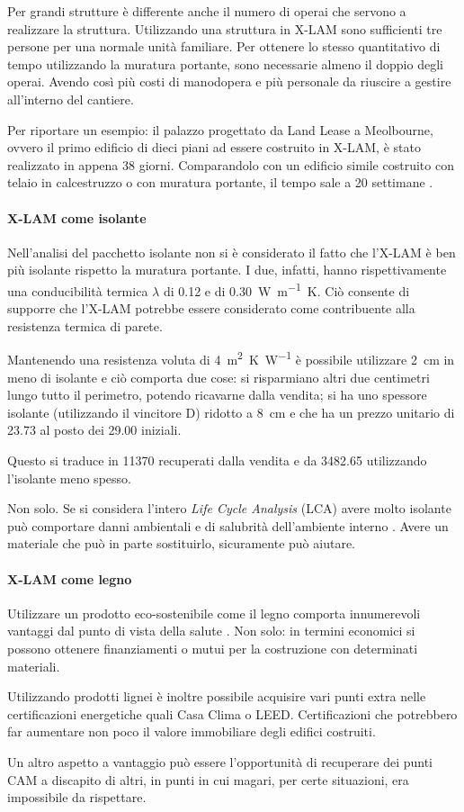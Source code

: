 Per grandi strutture è differente anche il numero di operai che servono a realizzare la struttura. Utilizzando una struttura in X-LAM sono sufficienti tre persone per una normale unità familiare. Per ottenere lo stesso quantitativo di tempo utilizzando la muratura portante, sono necessarie almeno il doppio degli operai. Avendo così più costi di manodopera e più personale da riuscire a gestire all'interno del cantiere. 

Per riportare un esempio: il palazzo progettato da Land Lease a Meolbourne, ovvero il primo edificio di dieci piani ad essere costruito in X-LAM, è stato realizzato in appena 38 giorni. Comparandolo con un edificio simile costruito con telaio in calcestruzzo o con muratura portante, il tempo sale a 20 settimane \cite[39]{10storey}. 


\paragraph{X-LAM come isolante}
Nell'analisi del pacchetto isolante non si è considerato il fatto che l'X-LAM è ben più isolante rispetto la muratura portante. I due, infatti, hanno rispettivamente una conducibilità termica $\lambda$ di \SI{0.12}{} e di \SI{0.30}{W\per\metre K}.
Ciò consente di supporre che l'X-LAM potrebbe essere considerato come contribuente alla resistenza termica di parete. 

Mantenendo una resistenza voluta di \SI{4}{\square\metre K\per W} è possibile utilizzare \SI{2}{\centi\metre} in meno di isolante e ciò comporta due cose: si risparmiano altri due centimetri lungo tutto il perimetro, potendo ricavarne dalla vendita; si ha uno spessore isolante (utilizzando il vincitore D) ridotto a \SI{8}{\centi\metre} e che ha un prezzo unitario di \SI{23.73}{\teuro} al posto dei \SI{29.00}{\teuro} iniziali.

Questo si traduce in \SI{11370}{\teuro} recuperati dalla vendita e da \SI{3482.65}{\teuro} utilizzando l'isolante meno spesso.

Non solo. Se si considera l'intero \textit{Life Cycle Analysis} (LCA) avere molto isolante può comportare danni ambientali e di salubrità dell'ambiente interno \cite{reijnders_comprehensiveness_1999}. Avere un materiale che può in parte sostituirlo, sicuramente può aiutare. 
\paragraph{X-LAM come legno}
Utilizzare un prodotto eco-sostenibile come il legno comporta innumerevoli vantaggi dal punto di vista della salute \cite{EnergyCost}. 
Non solo: in termini economici si possono ottenere finanziamenti o mutui per la costruzione con determinati materiali. 

Utilizzando prodotti lignei è inoltre possibile acquisire vari punti extra nelle certificazioni energetiche quali Casa Clima o LEED. 
Certificazioni che potrebbero far aumentare non poco il valore immobiliare degli edifici costruiti. 

Un altro aspetto a vantaggio può essere l'opportunità di recuperare dei punti CAM a discapito di altri, in punti in cui magari, per certe situazioni, era impossibile da rispettare.

\textcite{mallo_outlook_2014}
\textcite{wcms_wood_nodate}